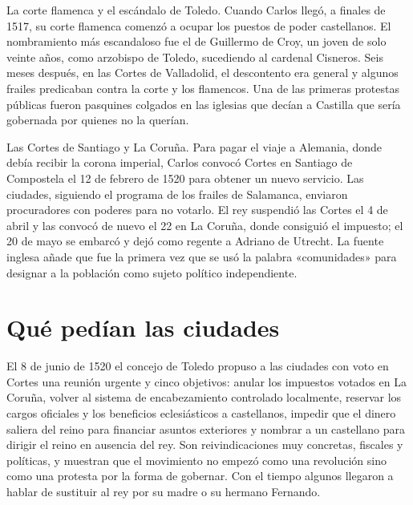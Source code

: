 \documentclass{book}
\begin{document}

La corte flamenca y el escándalo de Toledo. Cuando Carlos llegó, a finales de 1517, su corte flamenca comenzó a ocupar los puestos de poder castellanos. El nombramiento más escandaloso fue el de Guillermo de Croy, un joven de solo veinte años, como arzobispo de Toledo, sucediendo al cardenal Cisneros. Seis meses después, en las Cortes de Valladolid, el descontento era general y algunos frailes predicaban contra la corte y los flamencos. Una de las primeras protestas públicas fueron pasquines colgados en las iglesias que decían a Castilla que sería gobernada por quienes no la querían.


Las Cortes de Santiago y La Coruña. Para pagar el viaje a Alemania, donde debía recibir la corona imperial, Carlos convocó Cortes en Santiago de Compostela el 12 de febrero de 1520 para obtener un nuevo servicio. Las ciudades, siguiendo el programa de los frailes de Salamanca, enviaron procuradores con poderes para no votarlo. El rey suspendió las Cortes el 4 de abril y las convocó de nuevo el 22 en La Coruña, donde consiguió el impuesto; el 20 de mayo se embarcó y dejó como regente a Adriano de Utrecht. La fuente inglesa añade que fue la primera vez que se usó la palabra «comunidades» para designar a la población como sujeto político independiente.


\section{Qué pedían las ciudades}

El 8 de junio de 1520 el concejo de Toledo propuso a las ciudades con voto en Cortes una reunión urgente y cinco objetivos: anular los impuestos votados en La Coruña, volver al sistema de encabezamiento controlado localmente, reservar los cargos oficiales y los beneficios eclesiásticos a castellanos, impedir que el dinero saliera del reino para financiar asuntos exteriores y nombrar a un castellano para dirigir el reino en ausencia del rey. Son reivindicaciones muy concretas, fiscales y políticas, y muestran que el movimiento no empezó como una revolución sino como una protesta por la forma de gobernar. Con el tiempo algunos llegaron a hablar de sustituir al rey por su madre o su hermano Fernando.
\end{document}
